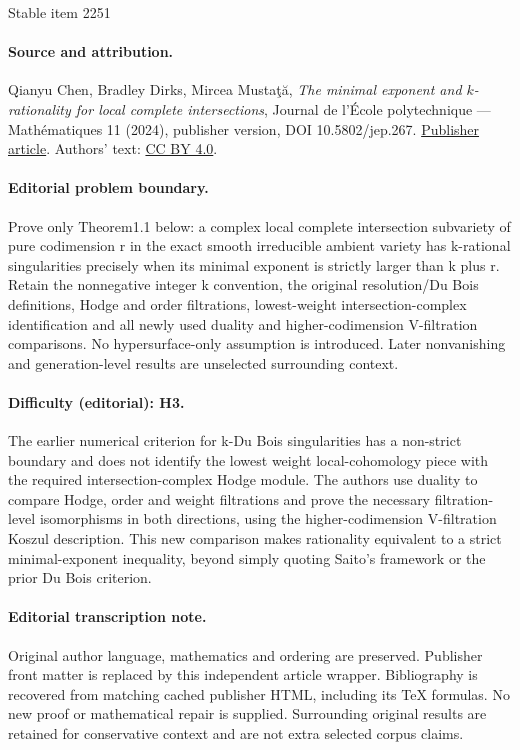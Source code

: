 \documentclass[11pt]{article}
\numberwithin{equation}{section}
\theoremstyle{plain}
\theoremstyle{definition}
\begin{document}
\begin{center}{\Large Stable item 2251}\end{center}
\paragraph{Source and attribution.}
Qianyu Chen, Bradley Dirks, Mircea Mustaţă, \emph{The minimal exponent and $k$-rationality for local complete intersections}, Journal de l’École polytechnique — Mathématiques 11 (2024), publisher version, DOI 10.5802/jep.267. \href{https://jep.centre-mersenne.org/articles/10.5802/jep.267/}{Publisher article}. Authors' text: \href{https://creativecommons.org/licenses/by/4.0/}{CC BY 4.0}.
\paragraph{Editorial problem boundary.}
Prove only Theorem1.1 below: a complex local complete intersection subvariety of pure codimension r in the exact smooth irreducible ambient variety has k-rational singularities precisely when its minimal exponent is strictly larger than k plus r. Retain the nonnegative integer k convention, the original resolution/Du Bois definitions, Hodge and order filtrations, lowest-weight intersection-complex identification and all newly used duality and higher-codimension V-filtration comparisons. No hypersurface-only assumption is introduced. Later nonvanishing and generation-level results are unselected surrounding context.
\paragraph{Difficulty (editorial): H3.}
The earlier numerical criterion for k-Du Bois singularities has a non-strict boundary and does not identify the lowest weight local-cohomology piece with the required intersection-complex Hodge module. The authors use duality to compare Hodge, order and weight filtrations and prove the necessary filtration-level isomorphisms in both directions, using the higher-codimension V-filtration Koszul description. This new comparison makes rationality equivalent to a strict minimal-exponent inequality, beyond simply quoting Saito's framework or the prior Du Bois criterion.
\paragraph{Editorial transcription note.}
Original author language, mathematics and ordering are preserved. Publisher front matter is replaced by this independent article wrapper. Bibliography is recovered from matching cached publisher HTML, including its TeX formulas. No new proof or mathematical repair is supplied. Surrounding original results are retained for conservative context and are not extra selected corpus claims.
\clearpage
\end{document}
